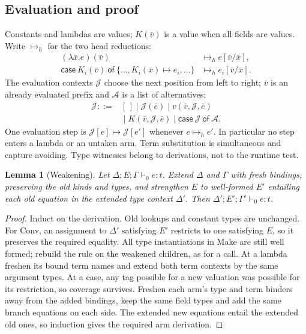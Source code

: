 \documentclass[11pt]{article}
\newtheorem{lemma}[theorem]{Lemma}
\theoremstyle{definition}
\begin{document}
\subsection{Evaluation and proof}
Constants and lambdas are values; $K(\bar v)$ is a value when all fields
are values. Write $\longmapsto_h$ for the two head reductions:
\[
\begin{aligned}
 (\lambda\bar x.e)(\bar v)&\longmapsto_h e[\bar v/\bar x],\\
 \mathsf{case}\ K_i(\bar v)\ \mathsf{of}\ \{\ldots,
       K_i(\bar x)\mapsto e_i,\ldots\}
       &\longmapsto_h e_i[\bar v/\bar x].
\end{aligned}
\]
The evaluation contexts $\mathcal J$ choose the next position from left
to right; $\bar v$ is an already evaluated prefix and $\mathcal A$ is a
list of alternatives:
\[
\begin{aligned}
 \mathcal J ::={}&[\,]\mid \mathcal J(\bar e)\mid v(\bar v,\mathcal J,\bar e)\\
                 &{}\mid K(\bar v,\mathcal J,\bar e)
                   \mid \mathsf{case}\ \mathcal J\ \mathsf{of}\ \mathcal A .
\end{aligned}
\]
One evaluation step is $\mathcal J[e]\longmapsto\mathcal J[e']$ whenever
$e\longmapsto_h e'$. In particular no step enters a lambda or an untaken
arm. Term substitution is simultaneous and capture avoiding. Type witnesses
belong to derivations, not to the runtime test.

\begin{lemma}[Weakening]\label{lem:weakening}
Let $\Delta;E;\Gamma\vdash_0 e:t$. Extend $\Delta$ and $\Gamma$ with
fresh bindings, preserving the old kinds and types, and strengthen $E$
to well-formed $E'$ entailing each old equation in the extended type
context $\Delta'$. Then $\Delta';E';\Gamma'\vdash_0 e:t$.
\end{lemma}
\begin{proof}
Induct on the derivation. Old lookups and constant types are unchanged.
For \textsf{Conv}, an assignment to $\Delta'$ satisfying $E'$ restricts
to one satisfying $E$, so it preserves the required equality. All type
instantiations in \textsf{Make} are still well formed; rebuild the rule
on the weakened children, as for a call. At a lambda freshen its bound
term names and extend both term contexts by the same argument types.
At a case, any tag possible for a new valuation was possible for its
restriction, so coverage survives. Freshen each arm's type and term
binders away from the added bindings, keep the same field types and add
the same branch equations on each side. The extended new equations entail
the extended old ones, so induction gives the required arm derivation.
\end{proof}
\end{document}
